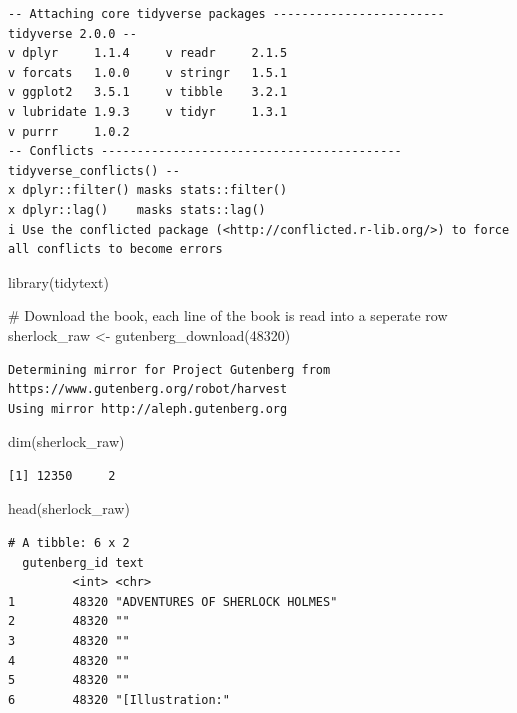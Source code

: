 \documentclass[
  letterpaper,
  DIV=11,
  numbers=noendperiod]{scrreprt}
\newenvironment{Shaded}{\begin{snugshade}}{\end{snugshade}}
\newcommand{\CommentTok}[1]{\textcolor[rgb]{0.37,0.37,0.37}{#1}}
\newcommand{\DecValTok}[1]{\textcolor[rgb]{0.68,0.00,0.00}{#1}}
\newcommand{\FunctionTok}[1]{\textcolor[rgb]{0.28,0.35,0.67}{#1}}
\newcommand{\NormalTok}[1]{\textcolor[rgb]{0.00,0.23,0.31}{#1}}
\newcommand{\OtherTok}[1]{\textcolor[rgb]{0.00,0.23,0.31}{#1}}
\begin{document}
\begin{verbatim}
-- Attaching core tidyverse packages ------------------------ tidyverse 2.0.0 --
v dplyr     1.1.4     v readr     2.1.5
v forcats   1.0.0     v stringr   1.5.1
v ggplot2   3.5.1     v tibble    3.2.1
v lubridate 1.9.3     v tidyr     1.3.1
v purrr     1.0.2     
-- Conflicts ------------------------------------------ tidyverse_conflicts() --
x dplyr::filter() masks stats::filter()
x dplyr::lag()    masks stats::lag()
i Use the conflicted package (<http://conflicted.r-lib.org/>) to force all conflicts to become errors
\end{verbatim}

\begin{Shaded}
\begin{Highlighting}[]
\FunctionTok{library}\NormalTok{(tidytext)}

\CommentTok{\# Download the book, each line of the book is read into a seperate row}
\NormalTok{sherlock\_raw }\OtherTok{\textless{}{-}} \FunctionTok{gutenberg\_download}\NormalTok{(}\DecValTok{48320}\NormalTok{)}
\end{Highlighting}
\end{Shaded}

\begin{verbatim}
Determining mirror for Project Gutenberg from https://www.gutenberg.org/robot/harvest
Using mirror http://aleph.gutenberg.org
\end{verbatim}

\begin{Shaded}
\begin{Highlighting}[]
\FunctionTok{dim}\NormalTok{(sherlock\_raw)}
\end{Highlighting}
\end{Shaded}

\begin{verbatim}
[1] 12350     2
\end{verbatim}

\begin{Shaded}
\begin{Highlighting}[]
\FunctionTok{head}\NormalTok{(sherlock\_raw)}
\end{Highlighting}
\end{Shaded}

\begin{verbatim}
# A tibble: 6 x 2
  gutenberg_id text                           
         <int> <chr>                          
1        48320 "ADVENTURES OF SHERLOCK HOLMES"
2        48320 ""                             
3        48320 ""                             
4        48320 ""                             
5        48320 ""                             
6        48320 "[Illustration:"               
\end{verbatim}
\end{document}
